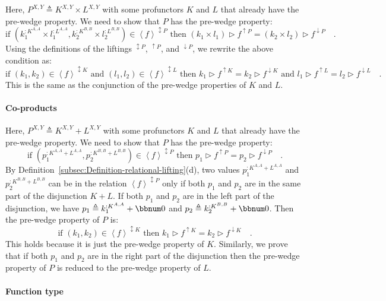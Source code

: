 Here, $P^{X,Y}\triangleq K^{X,Y}\times L^{X,Y}$ with some profunctors
$K$ and $L$ that already have the pre-wedge property. We need to
show that $P$ has the pre-wedge property:
\[
\text{if }(k_{1}^{:K^{A,A}}\times l_{1}^{:L^{A,A}},k_{2}^{:K^{B,B}}\times l_{2}^{:L^{B,B}})\in\left<f\right>^{\updownarrow P}\text{ then }(k_{1}\times l_{1})\triangleright f^{\uparrow P}=(k_{2}\times l_{2})\triangleright f^{\downarrow P}\quad.
\]
Using the definitions of the liftings $^{\updownarrow P}$, $^{\uparrow P}$,
and $^{\downarrow P}$, we rewrite the above condition as:
\[
\text{if }(k_{1},k_{2})\in\left<f\right>^{\updownarrow K}\text{ and }(l_{1},l_{2})\in\left<f\right>^{\updownarrow L}\text{ then }k_{1}\triangleright f^{\uparrow K}=k_{2}\triangleright f^{\downarrow K}\text{ and }l_{1}\triangleright f^{\uparrow L}=l_{2}\triangleright f^{\downarrow L}\quad.
\]
This is the same as the conjunction of the pre-wedge properties of
$K$ and $L$.

\paragraph{Co-products}

Here, $P^{X,Y}\triangleq K^{X,Y}+L^{X,Y}$ with some profunctors $K$
and $L$ that already have the pre-wedge property. We need to show
that $P$ has the pre-wedge property:
\[
\text{if }(p_{1}^{:K^{A,A}+L^{A,A}},p_{2}^{:K^{B,B}+L^{B,B}})\in\left<f\right>^{\updownarrow P}\text{ then }p_{1}\triangleright f^{\uparrow P}=p_{2}\triangleright f^{\downarrow P}\quad.
\]
By Definition~\ref{subsec:Definition-relational-lifting}(d), two
values $p_{1}^{:K^{A,A}+L^{A,A}}$ and $p_{2}^{:K^{B,B}+L^{B,B}}$
can be in the relation $\left<f\right>^{\updownarrow P}$ only if
both $p_{1}$ and $p_{2}$ are in the same part of the disjunction
$K+L$. If both $p_{1}$ and $p_{2}$ are in the left part of the
disjunction, we have $p_{1}\triangleq k_{1}^{:K^{A,A}}+\bbnum 0$
and $p_{2}\triangleq k_{2}^{:K^{B,B}}+\bbnum 0$. Then the pre-wedge
property of $P$ is:
\[
\text{if }(k_{1},k_{2})\in\left<f\right>^{\updownarrow K}\text{ then }k_{1}\triangleright f^{\uparrow K}=k_{2}\triangleright f^{\downarrow K}\quad.
\]
This holds because it is just the pre-wedge property of $K$. Similarly,
we prove that if both $p_{1}$ and $p_{2}$ are in the right part
of the disjunction then the pre-wedge property of $P$ is reduced
to the pre-wedge property of $L$.

\paragraph{Function type}

